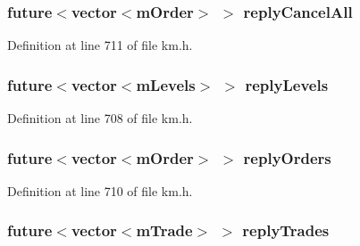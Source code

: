 \subsubsection[{\texorpdfstring{reply\+Cancel\+All}{replyCancelAll}}]{\setlength{\rightskip}{0pt plus 5cm}future$<$vector$<${\bf m\+Order}$>$ $>$ reply\+Cancel\+All\hspace{0.3cm}{\ttfamily [protected]}}\hypertarget{class_k_1_1_gw_a02a0f0472ebae5925916a1d6661f8375}{}\label{class_k_1_1_gw_a02a0f0472ebae5925916a1d6661f8375}


Definition at line 711 of file km.\+h.

\subsubsection[{\texorpdfstring{reply\+Levels}{replyLevels}}]{\setlength{\rightskip}{0pt plus 5cm}future$<$vector$<${\bf m\+Levels}$>$ $>$ reply\+Levels\hspace{0.3cm}{\ttfamily [protected]}}\hypertarget{class_k_1_1_gw_a37ee3b756d9b6633e81ff28125314fab}{}\label{class_k_1_1_gw_a37ee3b756d9b6633e81ff28125314fab}


Definition at line 708 of file km.\+h.

\subsubsection[{\texorpdfstring{reply\+Orders}{replyOrders}}]{\setlength{\rightskip}{0pt plus 5cm}future$<$vector$<${\bf m\+Order}$>$ $>$ reply\+Orders\hspace{0.3cm}{\ttfamily [protected]}}\hypertarget{class_k_1_1_gw_ab6cf63a19336c99e031b44359e68814f}{}\label{class_k_1_1_gw_ab6cf63a19336c99e031b44359e68814f}


Definition at line 710 of file km.\+h.

\subsubsection[{\texorpdfstring{reply\+Trades}{replyTrades}}]{\setlength{\rightskip}{0pt plus 5cm}future$<$vector$<${\bf m\+Trade}$>$ $>$ reply\+Trades\hspace{0.3cm}{\ttfamily [protected]}}\hypertarget{class_k_1_1_gw_a3648d850c8042fbb808b77b0ebec8087}{}\label{class_k_1_1_gw_a3648d850c8042fbb808b77b0ebec8087}



